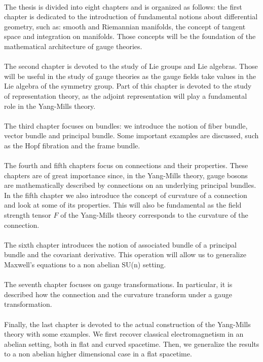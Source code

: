 \documentclass[12pt,a4paper]{report}
\theoremstyle{definition}
\theoremstyle{Theorem}
\theoremstyle{definition}
\theoremstyle{definition}
\begin{document}
	\\
	The thesis is divided into eight chapters and is organized as follows: the first chapter is dedicated to the introduction of fundamental notions about differential geometry, such as: smooth and Riemannian manifolds, the concept of tangent space and integration on manifolds. Those concepts will be the foundation of the mathematical architecture of gauge theories.\\
	\\
	The second chapter is devoted to the study of Lie groups and Lie algebras. Those will be useful in the study of gauge theories as the gauge fields take values in the Lie algebra of the symmetry group. Part of this chapter is devoted to the study of representation theory, as the adjoint representation will play a fundamental role in the Yang-Mills theory.\\
	\\
	The third chapter focuses on bundles: we introduce the notion of fiber bundle, vector bundle and principal bundle. Some important examples are discussed, such as the Hopf fibration and the frame bundle.\\
	\\
	The fourth and fifth chapters focus on connections and their properties. These chapters are of great importance since, in the Yang-Mills theory, gauge bosons are mathematically described by connections on an underlying principal bundles. In the fifth chapter we also introduce the concept of curvature of a connection and look at some of its properties. This will also be fundamental as the field strength tensor $F$ of the Yang-Mills theory corresponds to the curvature of the connection.\\
	\\
	The sixth chapter introduces the notion of associated bundle of a principal bundle and the covariant derivative. This operation will allow us to generalize Maxwell's equations to a non abelian SU(n) setting.\\
	\\
	The seventh chapter focuses on gauge transformations. In particular, it is described how the connection and the curvature transform under a gauge transformation.\\
	\\
	Finally, the last chapter is devoted to the actual construction of the Yang-Mills theory with some examples. We first recover classical electromagnetism in an abelian setting, both in flat and curved spacetime. Then, we generalize the results to a non abelian higher dimensional case in a flat spacetime.
\end{document}
